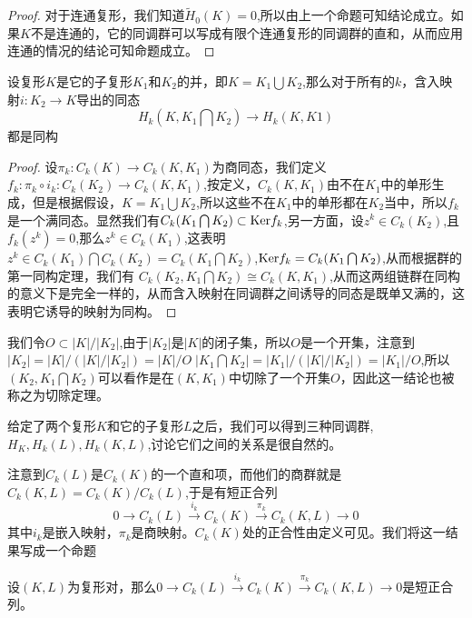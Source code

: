 \begin{proof}
对于连通复形，我们知道$\tilde{H}_{0}(K)=0$,所以由上一个命题可知结论成立。如果$K$不是连通的，它的同调群可以写成有限个连通复形的同调群的直和，从而应用连通的情况的结论可知命题成立。
\end{proof}
\begin{proposition}
设复形$K$是它的子复形$K_{1}$和$K_{2}$的并，即$K=K_{1}\bigcup K_{2}$,那么对于所有的$k$，含入映射$i:K_{2}\rightarrow K$导出的同态$$H_{k}(K,K_{1}\bigcap K_{2})\rightarrow H_{k}(K,K{1})$$都是同构
\end{proposition}
\begin{proof}
设$\pi_{k}:C_{k}(K)\rightarrow C_{k}(K,K_{1})$为商同态，我们定义$f_{k}:\pi_{k}\circ i_{k}:C_{k}(K_{2})\rightarrow C_{k}(K,K_{1})$,按定义，$C_{k}(K,K_{1})$由不在$K_{1}$中的单形生成，但是根据假设，$K=K_{1}\bigcup K_{2}$,所以这些不在$K_{1}$中的单形都在$K_{2}$当中，所以$f_{k}$是一个满同态。显然我们有$C_{k}(K_{1}\bigcap K_{2})\subset {\rm Ker} f_{k}$,另一方面，设$z^{k}\in C_{k}(K_{2})$,且$f_{k}(z^{k})=0$,那么$z^{k}\in C_{k}(K_{1})$,这表明$z^{k}\in C_{k}(K_{1})\bigcap C_{k}(K_{2})=C_{k}(K_{1}\bigcap K_{2})$,${\rm Ker} f_{k}=C_{k}(K_{1}\bigcap K_{2})$,从而根据群的第一同构定理，我们有
$C_{k}(K_{2},K_{1}\bigcap K_{2})\cong C_{k}(K,K_{1})$,从而这两组链群在同构的意义下是完全一样的，从而含入映射在同调群之间诱导的同态是既单又满的，这表明它诱导的映射为同构。
\end{proof}
\begin{remark}
我们令$O\subset |K|/|K_{2}|$,由于$|K_{2}|$是$|K|$的闭子集，所以$O$是一个开集，注意到$|K_{2}|=|K|/(|K|/|K_{2}|)=|K|/O\;|K_{1}\bigcap K_{2}|=|K_{1}|/(|K|/|K_{2}|)=|K_{1}|/O$,所以$(K_{2},K_{1}\bigcap K_{2})$可以看作是在$(K,K_{1})$中切除了一个开集$O$，因此这一结论也被称之为切除定理。
\end{remark}

给定了两个复形$K$和它的子复形$L$之后，我们可以得到三种同调群,$H_{K},H_{k}(L),H_{k}(K,L)$,讨论它们之间的关系是很自然的。

注意到$C_{k}(L)$是$C_{k}(K)$的一个直和项，而他们的商群就是$C_{k}(K,L)=C_{k}(K)/C_{k}(L)$,于是有短正合列
$$0\rightarrow C_{k}(L)\xrightarrow{i_{k}}C_{k}(K)\xrightarrow{\pi_{k}}C_{k}(K,L)\rightarrow 0$$
其中$i_{k}$是嵌入映射，$\pi_{k}$是商映射。$C_{k}(K)$处的正合性由定义可见。我们将这一结果写成一个命题
\begin{proposition}\label{chap3_pro_106}
设$(K,L)$为复形对，那么$0\rightarrow C_{k}(L)\xrightarrow{i_{k}}C_{k}(K)\xrightarrow{\pi_{k}}C_{k}(K,L)\rightarrow 0$是短正合列。
\end{proposition}

